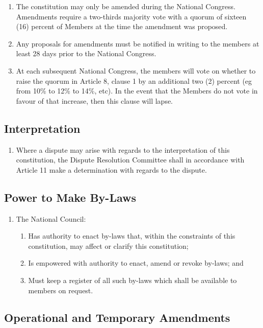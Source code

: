 \documentclass[a4paper,titlepage,8.5pt]{article}
\begin{document}
\begin{enumerate}
\item The constitution may only be amended during the National Congress. Amendments require a two-thirds majority vote with a quorum of sixteen (16) percent of Members at the time the amendment was proposed.
\item Any proposals for amendments must be notified in writing to the members at least 28 days prior to the National Congress.
\item At each subsequent National Congress, the members will vote on whether to raise the quorum in Article 8, clause 1 by an additional two (2) percent (eg from 10\% to 12\% to 14\%, etc). In the event that the Members do not vote in favour of that increase, then this clause will lapse.
\end{enumerate}

\subsection{Interpretation}

\begin{enumerate}
\item Where a dispute may arise with regards to the interpretation of this constitution, the Dispute Resolution Committee shall in accordance with Article 11 make a determination with regards to the dispute.
\end{enumerate}

\subsection{Power to Make By-Laws}

\begin{enumerate}
\item The National Council:
\begin{enumerate}
\item Has authority to enact by-laws that, within the constraints of this constitution, may affect or clarify this constitution;
\item Is empowered with authority to enact, amend or revoke by-laws; and
\item Must keep a register of all such by-laws which shall be available to members on request.
\end{enumerate}
\end{enumerate}

\subsection{Operational and Temporary Amendments}
\end{document}
